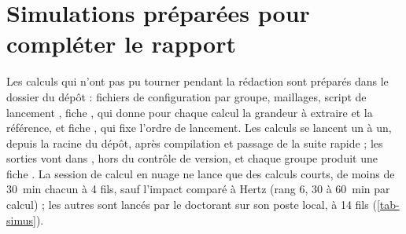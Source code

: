 \section{Simulations préparées pour compléter le rapport}
\label{sec-annexe-simus}

Les calculs qui n'ont pas pu tourner pendant la rédaction sont préparés dans le dossier  du dépôt : fichiers de configuration par groupe, maillages, script de lancement , fiche , qui donne pour chaque calcul la grandeur à extraire et la référence, et fiche , qui fixe l'ordre de lancement. Les calculs se lancent un à un, depuis la racine du dépôt, après compilation et passage de la suite rapide ; les sorties vont dans , hors du contrôle de version, et chaque groupe produit une fiche . La session de calcul en nuage ne lance que des calculs courts, de moins de 30~min chacun à 4 fils, sauf l'impact comparé à Hertz (rang 6, 30 à 60~min par calcul) ; les autres sont lancés par le doctorant sur son poste local, à 14 fils (\cref{tab-simus}).

